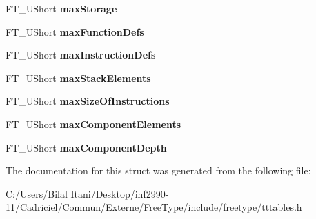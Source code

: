 \begin{DoxyCompactItemize}
\item 
F\+T\+\_\+\+U\+Short {\bfseries max\+Storage}\hypertarget{struct_t_t___max_profile___a502a8579e3d358f3c00776ed0cc8a168}{}\label{struct_t_t___max_profile___a502a8579e3d358f3c00776ed0cc8a168}

\item 
F\+T\+\_\+\+U\+Short {\bfseries max\+Function\+Defs}\hypertarget{struct_t_t___max_profile___acc24e822a62bbfaa86d36f691fcde60b}{}\label{struct_t_t___max_profile___acc24e822a62bbfaa86d36f691fcde60b}

\item 
F\+T\+\_\+\+U\+Short {\bfseries max\+Instruction\+Defs}\hypertarget{struct_t_t___max_profile___a3f7bd433baede417293415cf60f20d8f}{}\label{struct_t_t___max_profile___a3f7bd433baede417293415cf60f20d8f}

\item 
F\+T\+\_\+\+U\+Short {\bfseries max\+Stack\+Elements}\hypertarget{struct_t_t___max_profile___a2df9b9ff2a5a9daaa7c3d40fe024637f}{}\label{struct_t_t___max_profile___a2df9b9ff2a5a9daaa7c3d40fe024637f}

\item 
F\+T\+\_\+\+U\+Short {\bfseries max\+Size\+Of\+Instructions}\hypertarget{struct_t_t___max_profile___ac458411198b09d303ec8ae206e6926b6}{}\label{struct_t_t___max_profile___ac458411198b09d303ec8ae206e6926b6}

\item 
F\+T\+\_\+\+U\+Short {\bfseries max\+Component\+Elements}\hypertarget{struct_t_t___max_profile___a110e6d735610c6d8fd89221d03440c32}{}\label{struct_t_t___max_profile___a110e6d735610c6d8fd89221d03440c32}

\item 
F\+T\+\_\+\+U\+Short {\bfseries max\+Component\+Depth}\hypertarget{struct_t_t___max_profile___a9ae1f117c954e0711b03f1675d6191d9}{}\label{struct_t_t___max_profile___a9ae1f117c954e0711b03f1675d6191d9}

\end{DoxyCompactItemize}


The documentation for this struct was generated from the following file\+:\begin{DoxyCompactItemize}
\item 
C\+:/\+Users/\+Bilal Itani/\+Desktop/inf2990-\/11/\+Cadriciel/\+Commun/\+Externe/\+Free\+Type/include/freetype/tttables.\+h\end{DoxyCompactItemize}
